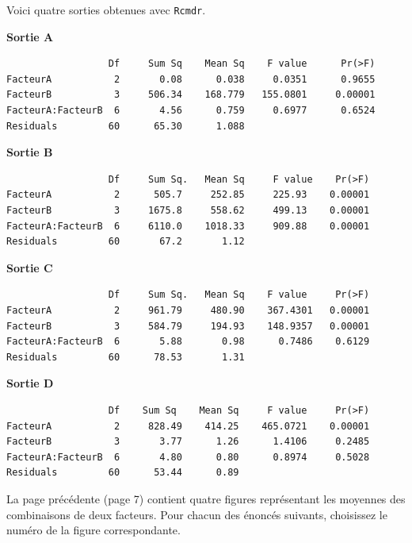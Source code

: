 \begin{questions}
Voici quatre sorties obtenues avec \texttt{Rcmdr}.

\smallskip
{\bf Sortie A}
\begin{verbatim}
                  Df     Sum Sq    Mean Sq    F value      Pr(>F)    
FacteurA           2       0.08      0.038     0.0351      0.9655    
FacteurB           3     506.34    168.779   155.0801     0.00001
FacteurA:FacteurB  6       4.56      0.759     0.6977      0.6524    
Residuals         60      65.30      1.088                         
\end{verbatim}

{\bf Sortie B}
\begin{verbatim}
                  Df     Sum Sq.   Mean Sq     F value    Pr(>F)    
FacteurA           2      505.7     252.85     225.93    0.00001
FacteurB           3     1675.8     558.62     499.13    0.00001
FacteurA:FacteurB  6     6110.0    1018.33     909.88    0.00001
Residuals         60       67.2       1.12                           
\end{verbatim}

{\bf Sortie C}
\begin{verbatim}
                  Df     Sum Sq.   Mean Sq    F value     Pr(>F)    
FacteurA           2     961.79     480.90    367.4301   0.00001
FacteurB           3     584.79     194.93    148.9357   0.00001
FacteurA:FacteurB  6       5.88       0.98      0.7486    0.6129    
Residuals         60      78.53       1.31                         
\end{verbatim}

{\bf Sortie D}
\begin{verbatim}
                  Df    Sum Sq    Mean Sq     F value     Pr(>F)    
FacteurA           2     828.49    414.25    465.0721    0.00001
FacteurB           3       3.77      1.26      1.4106     0.2485    
FacteurA:FacteurB  6       4.80      0.80      0.8974     0.5028    
Residuals         60      53.44      0.89               
\end{verbatim}

\medskip
La page précédente (page 7) contient quatre figures représentant les moyennes des combinaisons de deux facteurs.
Pour chacun des énoncés suivants, choisissez le numéro de la figure correspondante.

\medskip\medskip
{}
\end{questions}
